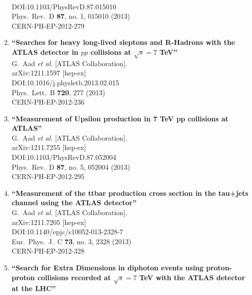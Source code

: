 \documentclass{article}
\begin{document}
\begin{enumerate}
  \\{}DOI:10.1103/PhysRevD.87.015010
  \\{}Phys.\ Rev.\ D {\bf 87}, no. 1, 015010 (2013)
  \\{}CERN-PH-EP-2012-279
\item%
{\bf ``Searches for heavy long-lived sleptons and R-Hadrons with the ATLAS detector in $pp$ collisions at $\sqrt{s}=7$ TeV''}
  \\{}G.~Aad {\it et al.} [ATLAS Collaboration].
  \\{}arXiv:1211.1597 [hep-ex]
  \\{}DOI:10.1016/j.physletb.2013.02.015
  \\{}Phys.\ Lett.\ B {\bf 720}, 277 (2013)
  \\{}CERN-PH-EP-2012-236
\item%
{\bf ``Measurement of Upsilon production in 7 TeV pp collisions at ATLAS''}
  \\{}G.~Aad {\it et al.} [ATLAS Collaboration].
  \\{}arXiv:1211.7255 [hep-ex]
  \\{}DOI:10.1103/PhysRevD.87.052004
  \\{}Phys.\ Rev.\ D {\bf 87}, no. 5, 052004 (2013)
  \\{}CERN-PH-EP-2012-295
\item%
{\bf ``Measurement of the ttbar production cross section in the tau+jets channel using the ATLAS detector''}
  \\{}G.~Aad {\it et al.} [ATLAS Collaboration].
  \\{}arXiv:1211.7205 [hep-ex]
  \\{}DOI:10.1140/epjc/s10052-013-2328-7
  \\{}Eur.\ Phys.\ J.\ C {\bf 73}, no. 3, 2328 (2013)
  \\{}CERN-PH-EP-2012-328
\item%
{\bf ``Search for Extra Dimensions in diphoton events using proton-proton collisions recorded at $\sqrt{s}=7$ TeV with the ATLAS detector at the LHC''}

\end{enumerate}
\end{document}
